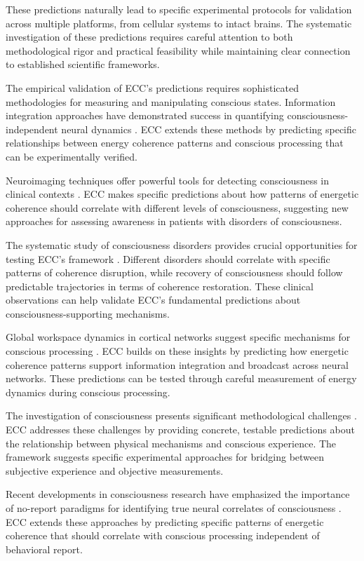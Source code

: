 These predictions naturally lead to specific experimental protocols for validation across multiple platforms, from cellular systems to intact brains. The systematic investigation of these predictions requires careful attention to both methodological rigor and practical feasibility while maintaining clear connection to established scientific frameworks.

The empirical validation of ECC's predictions requires sophisticated methodologies for measuring and manipulating conscious states. Information integration approaches have demonstrated success in quantifying consciousness-independent neural dynamics \cite{Casali2013}. ECC extends these methods by predicting specific relationships between energy coherence patterns and conscious processing that can be experimentally verified.

Neuroimaging techniques offer powerful tools for detecting consciousness in clinical contexts \cite{Owen2013}. ECC makes specific predictions about how patterns of energetic coherence should correlate with different levels of consciousness, suggesting new approaches for assessing awareness in patients with disorders of consciousness.

The systematic study of consciousness disorders provides crucial opportunities for testing ECC's framework \cite{Giacino2014}. Different disorders should correlate with specific patterns of coherence disruption, while recovery of consciousness should follow predictable trajectories in terms of coherence restoration. These clinical observations can help validate ECC's fundamental predictions about consciousness-supporting mechanisms.

Global workspace dynamics in cortical networks suggest specific mechanisms for conscious processing \cite{Baars2013}. ECC builds on these insights by predicting how energetic coherence patterns support information integration and broadcast across neural networks. These predictions can be tested through careful measurement of energy dynamics during conscious processing.

The investigation of consciousness presents significant methodological challenges \cite{Seth2010}. ECC addresses these challenges by providing concrete, testable predictions about the relationship between physical mechanisms and conscious experience. The framework suggests specific experimental approaches for bridging between subjective experience and objective measurements.

Recent developments in consciousness research have emphasized the importance of no-report paradigms for identifying true neural correlates of consciousness \cite{Tsuchiya2015}. ECC extends these approaches by predicting specific patterns of energetic coherence that should correlate with conscious processing independent of behavioral report.

